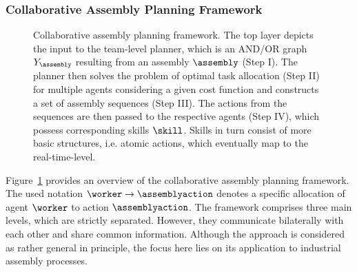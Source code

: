 \subsubsection{Collaborative Assembly Planning Framework}

\begin{figure}[ht!]

\caption{Collaborative assembly planning framework. The top layer depicts the input to the team-level planner, which is an AND/OR graph $Y_\assembly$ resulting from an assembly $\assembly$ (Step I).
The planner then solves the problem of optimal task allocation (Step II) for multiple agents considering a given cost function and constructs a set of assembly sequences (Step III).
The actions from the sequences are then passed to the respective agents (Step IV), which possess corresponding skills $\skill$.
Skills in turn consist of more basic structures, i.e. atomic actions, which eventually map to the real-time-level.}
\label{fig:foundations:planning:concept}
\end{figure}

Figure~\ref{fig:foundations:planning:concept} provides an overview of the collaborative assembly planning framework.
The used notation $\worker \rightarrow \assemblyaction$ denotes a specific allocation of agent $\worker$ to action $\assemblyaction$.
The framework comprises three main levels, which are strictly separated.
However, they communicate bilaterally with each other and share common information.
Although the approach is considered as rather general in principle, the focus here lies on its application to industrial assembly processes. 



